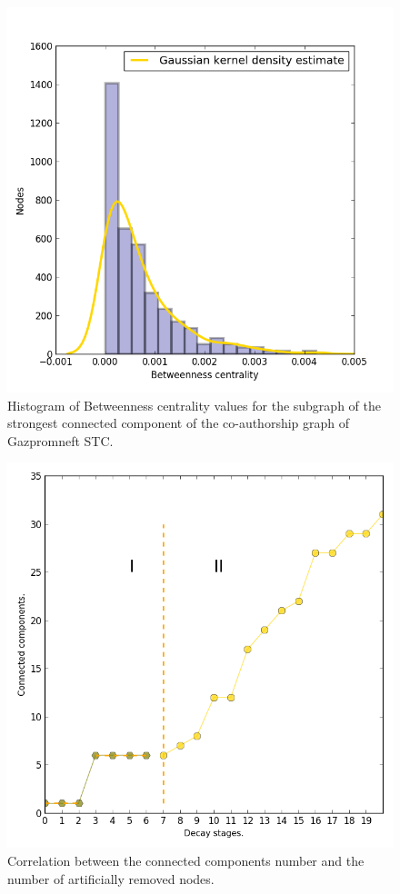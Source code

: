 \documentclass[12pt]{report}
\theoremstyle{definition}
\begin{document}
\begin{figure}[!ht]
	\centering
	\includegraphics[width=\textwidth]{allo4eng.png}
	\caption{Histogram of Betweenness centrality values for the subgraph of the strongest connected component of the co-authorship graph of Gazpromneft STC.}
	\label{fig:allo4}
\end{figure}

\begin{figure}[ht]
	\centering
	\includegraphics[width=\textwidth]{allo5eng.png}
	\caption{Correlation between the connected components number and the number of artificially removed nodes.}
	\label{fig:allo5}
\end{figure}
\end{document}
